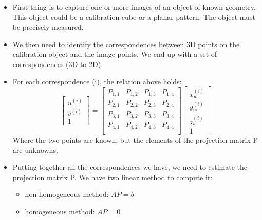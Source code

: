 \documentclass{article}
\begin{document}
\begin{itemize}
    \item First thing is to capture one or more images of an object of known geometry. This object could be a calibration cube or a planar pattern. The object must be precisely measured. 
    \item We then need to identify the correspondences between 3D points on the calibration object and the image points. We end up with a set of correspondences (3D to 2D).
    \item For each correspondence (i), the relation above holds:
    \begin{equation*}
        \begin{bmatrix}
            u^{(i)} \\
            v^{(i)} \\
            1
        \end{bmatrix}
        = 
        \begin{bmatrix}
            P_{1,1} & P_{1,2} & P_{1,3} & P_{1,4} \\
            P_{2,1} & P_{2,2} & P_{2,3} & P_{2,4} \\
            P_{3,1} & P_{3,2} & P_{3,3} & P_{3,4} \\
            P_{4,1} & P_{4,2} & P_{4,3} & P_{4,4} \\
        \end{bmatrix}
        \begin{bmatrix}
            x_w^{(i)} \\
            y_w^{(i)} \\
            z_w^{(i)} \\
            1
        \end{bmatrix}
    \end{equation*}
    Where the two points are known, but the elements of the projection matrix P are unknowns.
    \item Putting together all the correspondences we have, we need to estimate the projection matrix P. We have two linear method to compute it:
    \begin{itemize}
        \item non homogeneous method: $A P = b$
        \item homogeneous method: $A P = 0$
    \end{itemize}


\end{itemize}
\end{document}
